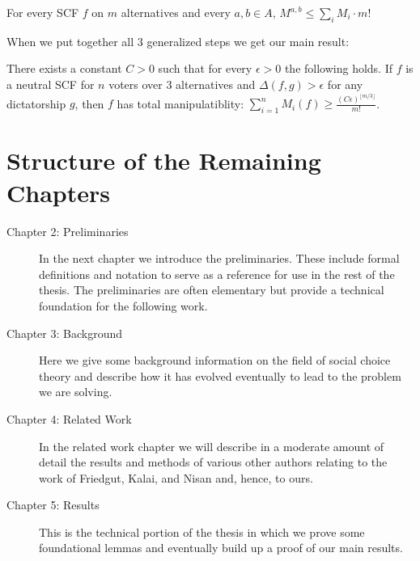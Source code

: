 	\begin{lemma}
		For every SCF $f$ on $m$ alternatives and every $a,b \in A$, $M^{a,b} \le \sum_i M_i \cdot m!$
	\end{lemma}

	When we put together all 3 generalized steps we get our main result:
	\begin{theorem}
		There exists a constant $C > 0$ such that for every $\epsilon > 0$ the following holds. If $f$ is a neutral SCF for $n$ voters over 3 alternatives and $\Delta(f, g) > \epsilon$ for any dictatorship $g$, then $f$ has total manipulatiblity: $\sum^n_{i=1} M_i(f) \ge \frac{(C\epsilon)^{\lfloor m/3 \rfloor}}{m!}$.
	\end{theorem}


\section{Structure of the Remaining Chapters}

	\begin{description}
		\item[Chapter 2: Preliminaries] In the next chapter we introduce the preliminaries. These include formal definitions and notation to serve as a reference for use in the rest of the thesis. The preliminaries are often elementary but provide a technical foundation for the following work.

		\item[Chapter 3: Background] Here we give some background information on the field of social choice theory and describe how it has evolved eventually to lead to the problem we are solving.

		\item[Chapter 4: Related Work] In the related work chapter we will describe in a moderate amount of detail the results and methods of various other authors relating to the work of Friedgut, Kalai, and Nisan and, hence, to ours.

		\item[Chapter 5: Results] This is the technical portion of the thesis in which we prove some foundational lemmas and eventually build up a proof of our main results.
	\end{description}
